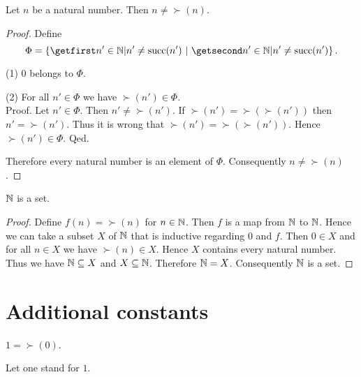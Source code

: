\documentclass[../arithmetic.tex]{subfiles}
\begin{document}
  \begin{forthel}
    \begin{proposition}
      Let $n$ be a natural number.
      Then $n \neq \succ(n)$.
    \end{proposition}
    \begin{proof}
      Define \[ \Phi = \class{n' \in \Nat | n' \neq \succ(n')}. \]

      (1) $0$ belongs to $\Phi$.

      (2) For all $n' \in \Phi$ we have $\succ(n') \in \Phi$. \\
      Proof.
        Let $n' \in \Phi$.
        Then $n' \neq \succ(n')$.
        If $\succ(n') = \succ(\succ(n'))$ then $n' = \succ(n')$.
        Thus it is wrong that $\succ(n') = \succ(\succ(n'))$.
        Hence $\succ(n') \in \Phi$.
      Qed.

      Therefore every natural number is an element of $\Phi$.
      Consequently $n \neq \succ(n)$.
    \end{proof}
  \end{forthel}

  \begin{forthel}
    \begin{proposition}
      $\mathbb{N}$ is a set.
    \end{proposition}
    \begin{proof}
      Define $f(n) = \succ(n)$ for $n \in \mathbb{N}$.
      Then $f$ is a map from $\mathbb{N}$ to $\mathbb{N}$.
      Hence we can take a subset $X$ of $\mathbb{N}$ that is inductive regarding
      $0$ and $f$.
      Then $0 \in X$ and for all $n \in X$ we have $\succ(n) \in X$.
      Hence $X$ contains every natural number.
      Thus we have $\mathbb{N} \subseteq X$ and $X \subseteq \mathbb{N}$.
      Therefore $\mathbb{N} = X$.
      Consequently $\mathbb{N}$ is a set.
    \end{proof}
  \end{forthel}


  \section{Additional constants}

  \begin{forthel}
    \begin{definition}
      $1 = \succ(0)$.
    \end{definition}

    Let one stand for $1$.
  \end{forthel}
\end{document}
